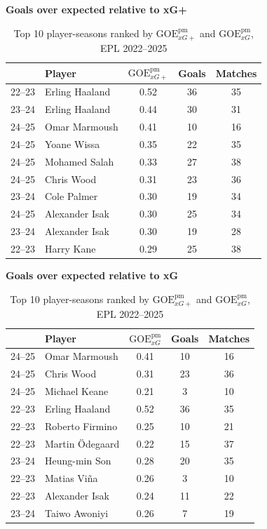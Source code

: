 \documentclass[12pt,letterpaper]{article}
\begin{document}
\begin{table}[ht!]
\centering\footnotesize
\setlength{\tabcolsep}{2pt}
\renewcommand{\arraystretch}{0.9}
\caption{Top 10 player-seasons ranked by $\text{GOE}^{\text{pm}}_{xG+}$ and $\text{GOE}^{\text{pm}}_{xG}$, EPL 2022--2025}
\label{tab:xSvsXG}

\begin{minipage}{0.45\textwidth}
\centering
\textbf{Goals over expected relative to xG+}\\[2pt]
\begin{tabular}{llccc}
\toprule
 & \textbf{Player} & $\text{GOE}^{\text{pm}}_{xG+}$ & \textbf{Goals} & \textbf{Matches} \\
\midrule
22--23 & Erling Haaland     & 0.52 & 36 & 35 \\
23--24 & Erling Haaland     & 0.44 & 30 & 31 \\
24--25 & Omar Marmoush      & 0.41 & 10 & 16 \\
24--25 & Yoane Wissa        & 0.35 & 22 & 35 \\
24--25 & Mohamed Salah      & 0.33 & 27 & 38 \\
24--25 & Chris Wood         & 0.31 & 23 & 36 \\
23--24 & Cole Palmer        & 0.30 & 19 & 34 \\
24--25 & Alexander Isak     & 0.30 & 25 & 34 \\
23--24 & Alexander Isak     & 0.30 & 19 & 28 \\
22--23 & Harry Kane         & 0.29 & 25 & 38 \\
\bottomrule
\end{tabular}
\end{minipage}
\hspace{0.02\textwidth}
\begin{minipage}{0.45\textwidth}
\centering
\textbf{Goals over expected relative to xG}\\[2pt]
\begin{tabular}{llccc}
\toprule
 & \textbf{Player} & $\text{GOE}^{\text{pm}}_{xG}$ & \textbf{Goals} & \textbf{Matches} \\
\midrule
24--25 & Omar Marmoush      & 0.41 & 10 & 16 \\
24--25 & Chris Wood         & 0.31 & 23 & 36 \\
24--25 & Michael Keane      & 0.21 &  3 & 10 \\
22--23 & Erling Haaland     & 0.52 & 36 & 35 \\
22--23 & Roberto Firmino    & 0.25 & 10 & 21 \\
22--23 & Martin \"{O}degaard & 0.22 & 15 & 37 \\
23--24 & Heung-min Son      & 0.28 & 20 & 35 \\
22--23 & Matias Vi\~{n}a    & 0.26 &  3 & 10 \\
22--23 & Alexander Isak     & 0.24 & 11 & 22 \\
23--24 & Taiwo Awoniyi      & 0.26 &  7 & 19 \\
\bottomrule
\end{tabular}
\end{minipage}


\end{table}
\end{document}
